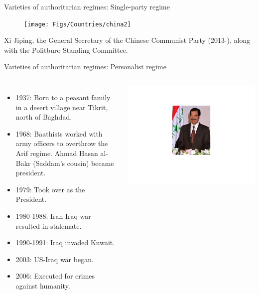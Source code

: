 \documentclass[10pt]{beamer}
\begin{document}
\begin{frame}{Varieties of authoritarian regimes: Single-party regime}
	\begin{figure}
	\centering
	\texttt{[image: Figs/Countries/china2]}
	\end{figure}
	\centering
	Xi Jiping, the General Secretary of the Chinese Communist Party (2013-), along with the Politburo Standing Committee.
\end{frame}

\begin{frame}{Varieties of authoritarian regimes: Personalist regime}
	\begin{columns}
	\begin{itemize}
	\small
	\item 1937: Born to a peasant family in a desert village near Tikrit, north of Baghdad.
	\item 1968: Baathists worked with army officers to overthrow the Arif regime. Ahmad Hasan al-Bakr (Saddam's cousin) became president.
	\item 1979: Took over as the President.
	\item 1980-1988: Iran-Iraq war resulted in stalemate.
	\item 1990-1991: Iraq invaded Kuwait.
	\item 2003: US-Iraq war began.
	\item 2006: Executed for crimes against humanity.  
	\end{itemize}
    \centering
    \includegraphics[scale=0.7]{Figs/Countries/iraq}
    \end{columns}
\end{frame}
\end{document}
